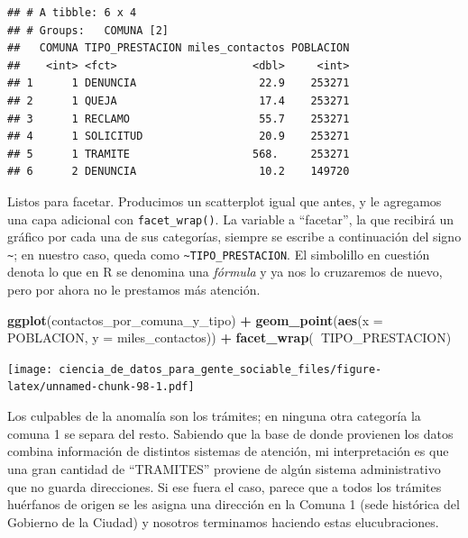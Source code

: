 \documentclass[spanish,]{book}
\newenvironment{Shaded}{\begin{snugshade}}{\end{snugshade}}
\newcommand{\DataTypeTok}[1]{\textcolor[rgb]{0.13,0.29,0.53}{#1}}
\newcommand{\KeywordTok}[1]{\textcolor[rgb]{0.13,0.29,0.53}{\textbf{#1}}}
\newcommand{\NormalTok}[1]{#1}
\newcommand{\OperatorTok}[1]{\textcolor[rgb]{0.81,0.36,0.00}{\textbf{#1}}}
\newcommand{\StringTok}[1]{\textcolor[rgb]{0.31,0.60,0.02}{#1}}
\begin{document}
\begin{verbatim}
## # A tibble: 6 x 4
## # Groups:   COMUNA [2]
##   COMUNA TIPO_PRESTACION miles_contactos POBLACION
##    <int> <fct>                     <dbl>     <int>
## 1      1 DENUNCIA                   22.9    253271
## 2      1 QUEJA                      17.4    253271
## 3      1 RECLAMO                    55.7    253271
## 4      1 SOLICITUD                  20.9    253271
## 5      1 TRAMITE                   568.     253271
## 6      2 DENUNCIA                   10.2    149720
\end{verbatim}

Listos para facetar. Producimos un scatterplot igual que antes, y le agregamos una capa adicional con \texttt{facet\_wrap()}. La variable a ``facetar'', la que recibirá un gráfico por cada una de sus categorías, siempre se escribe a continuación del signo \texttt{\textasciitilde{}}; en nuestro caso, queda como \texttt{\textasciitilde{}TIPO\_PRESTACION}. El simbolillo en cuestión denota lo que en R se denomina una \emph{fórmula} y ya nos lo cruzaremos de nuevo, pero por ahora no le prestamos más atención.

\begin{Shaded}
\begin{Highlighting}[]
\KeywordTok{ggplot}\NormalTok{(contactos_por_comuna_y_tipo) }\OperatorTok{+}\StringTok{ }
\StringTok{    }\KeywordTok{geom_point}\NormalTok{(}\KeywordTok{aes}\NormalTok{(}\DataTypeTok{x =}\NormalTok{ POBLACION, }\DataTypeTok{y =}\NormalTok{ miles_contactos)) }\OperatorTok{+}
\StringTok{    }\KeywordTok{facet_wrap}\NormalTok{(}\OperatorTok{~}\NormalTok{TIPO_PRESTACION)}
\end{Highlighting}
\end{Shaded}

\texttt{[image: ciencia\_de\_datos\_para\_gente\_sociable\_files/figure-latex/unnamed-chunk-98-1.pdf]}

Los culpables de la anomalía son los trámites; en ninguna otra categoría la comuna 1 se separa del resto. Sabiendo que la base de donde provienen los datos combina información de distintos sistemas de atención, mi interpretación es que una gran cantidad de ``TRAMITES'' proviene de algún sistema administrativo que no guarda direcciones. Si ese fuera el caso, parece que a todos los trámites huérfanos de origen se les asigna una dirección en la Comuna 1 (sede histórica del Gobierno de la Ciudad) y nosotros terminamos haciendo estas elucubraciones.
\end{document}
